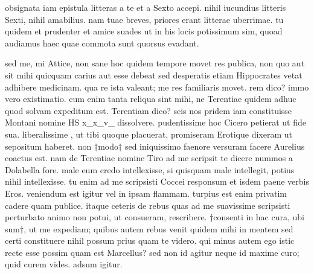 obsignata iam epistula litteras a te et a Sexto accepi. nihil iucundius litteris Sexti, nihil amabilius. nam tuae breves, priores erant litterae uberrimae. tu quidem et prudenter et amice suades ut in his locis potissimum sim, quoad audiamus haec quae commota sunt quorsus evadant.

 sed me, mi Attice, non sane hoc quidem tempore movet res publica, non quo aut sit mihi quicquam carius aut esse debeat sed desperatis etiam Hippocrates vetat adhibere medicinam. qua re ista valeant; me res familiaris movet. rem dico? immo vero existimatio. cum enim tanta reliqua sint mihi, ne Terentiae quidem adhuc quod solvam expeditum est. Terentiam dico? scis nos pridem iam constituisse Montani nomine HS x_x_v_ dissolvere. pudentissime hoc Cicero petierat ut fide sua. liberalissime , ut tibi quoque placuerat, promiseram Erotique dixeram ut sepositum haberet. non †modo† sed iniquissimo faenore versuram facere Aurelius coactus est. nam de Terentiae nomine Tiro ad me scripsit te dicere nummos a Dolabella fore. male eum credo intellexisse, si quisquam male intellegit, potius nihil intellexisse. tu enim ad me scripsisti Coccei responsum et isdem paene verbis Eros. veniendum est igitur vel in ipsam flammam. turpius est enim privatim cadere quam publice. itaque ceteris de rebus quas ad me suavissime scripsisti perturbato animo non potui, ut consueram, rescribere. †consenti in hac cura, ubi sum†, ut me expediam; quibus autem rebus venit quidem mihi in mentem sed certi constituere nihil possum prius quam te videro. qui minus autem ego istic recte esse possim quam est Marcellus? sed non id agitur neque id maxime curo; quid curem vides. adsum igitur.
